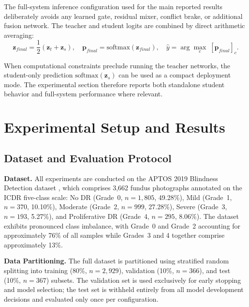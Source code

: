 \documentclass[a4paper,fleqn]{cas-dc}
\begin{document}
                                    The full-system inference configuration used for the main reported results deliberately avoids any learned gate, residual mixer, conflict brake, or additional fusion network. The teacher and student logits are combined by direct arithmetic averaging:
                                    \begin{equation}
                                      \mathbf{z}_{final} = \frac{1}{2}\!\left(\mathbf{z}_t + \mathbf{z}_s\right), \quad
                                      \mathbf{p}_{final}=\mathrm{softmax}(\mathbf{z}_{final}), \quad
\hat{y} = \arg\max_c\; [\mathbf{p}_{final}]_c.
\end{equation}

When computational constraints preclude running the teacher networks, the student-only prediction $\mathrm{softmax}(\mathbf{z}_s)$ can be used as a compact deployment mode. The experimental section therefore reports both standalone student behavior and full-system performance where relevant.


\section{Experimental Setup and Results}

\subsection{Dataset and Evaluation Protocol}

\textbf{Dataset.} All experiments are conducted on the APTOS 2019 Blindness Detection dataset \cite{aptos2019}, which comprises 3,662 fundus photographs annotated on the ICDR five-class scale: No DR (Grade~0, $n{=}1{,}805$, 49.28\%), Mild (Grade~1, $n{=}370$, 10.10\%), Moderate (Grade~2, $n{=}999$, 27.28\%), Severe (Grade~3, $n{=}193$, 5.27\%), and Proliferative DR (Grade~4, $n{=}295$, 8.06\%). The dataset exhibits pronounced class imbalance, with Grade~0 and Grade~2 accounting for approximately 76\% of all samples while Grades~3 and 4 together comprise approximately 13\%.

\textbf{Data Partitioning.} The full dataset is partitioned using stratified random splitting into training (80\%, $n{=}2{,}929$), validation (10\%, $n{=}366$), and test (10\%, $n{=}367$) subsets. The validation set is used exclusively for early stopping and model selection; the test set is withheld entirely from all model development decisions and evaluated only once per configuration.
\end{document}
